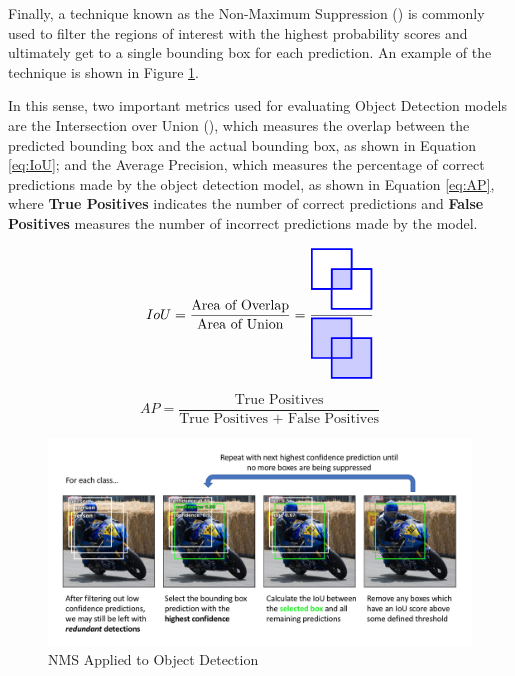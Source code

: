 \documentclass[openright]{normas-utf-tex} %
\begin{document}
Finally, a technique known as the Non-Maximum Suppression
() is commonly used to filter the regions
of interest with the highest probability scores and ultimately get to a single
bounding box for each prediction. 
An example of the technique is shown in Figure \ref{fig:nmsObjectDetection}.

In this sense, two important metrics used for evaluating Object Detection models
are the Intersection over Union (), which measures 
the overlap between the predicted bounding box and the actual bounding box, 
as shown in Equation \ref{eq:IoU}; and the Average Precision, which measures the percentage 
of correct predictions made by the object detection model, as shown in Equation 
\ref{eq:AP}, where \textbf{True Positives} indicates the number of correct predictions and
\textbf{False Positives} measures the number of incorrect predictions made by the model.

\begin{equation}
\label{eq:IoU}
IoU = \frac{\text{Area of Overlap}}{\text{Area of Union}}=
\frac{
    \tikz{\fill[draw=blue, very thick, fill=blue!20] (0,0) rectangle (1,1) (0.5,-0.5) rectangle (1.5,0.5);
    \fill[draw=blue, very thick, fill=white, even odd rule] (0,0) rectangle (1,1) (0.5,-0.5) rectangle (1.5,0.5);}}
{\tikz{\fill[draw=blue, fill=blue!20, very thick] (0,0) rectangle (1,1) (0.5,-0.5) rectangle (1.5,0.5);}}
\end{equation}

\begin{equation}
	\label{eq:AP}
	AP = \frac{\text{True Positives}}{\text{True Positives + False Positives}}
\end{equation}


\begin{figure}[H]
	\centering
	\includegraphics[width=1\textwidth]{./images/nms-object-detection.png }
	\caption[NMS Applied to Object Detection]{NMS Applied to Object Detection}
	\label{fig:nmsObjectDetection}
\end{figure}
\end{document}
